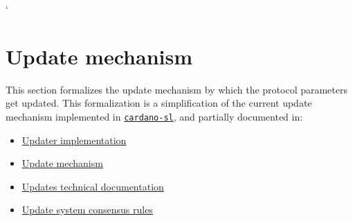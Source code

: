 \newcommand{\UProp}{\ensuremath{\type{UProp}}}
\newcommand{\UPropId}{\ensuremath{\type{UpId}}}
\newcommand{\UPropSD}{\ensuremath{\type{UpSD}}}
\newcommand{\ProtVer}{\ensuremath{\type{ProtVer}}}
\newcommand{\ProtPm}{\ensuremath{\type{Ppm}}}
\newcommand{\Rpus}{\ensuremath{\type{Rpus}}}
\newcommand{\UPVEnv}{\ensuremath{\type{UPVEnv}}}
\newcommand{\UPVState}{\ensuremath{\type{UPVState}}}
\newcommand{\UPLEnv}{\ensuremath{\type{UPLEnv}}}
\newcommand{\UPLState}{\ensuremath{\type{UPLState}}}
\newcommand{\UPREnv}{\ensuremath{\type{UPREnv}}}
\newcommand{\UPRState}{\ensuremath{\type{UPRState}}}
\newcommand{\Vote}{\ensuremath{\type{Vote}}}
\newcommand{\VEnv}{\ensuremath{\type{VEnv}}}
\newcommand{\VState}{\ensuremath{\type{VState}}}
\newcommand{\BVREnv}{\ensuremath{\type{BVREnv}}}
\newcommand{\BVRState}{\ensuremath{\type{BVRState}}}
\newcommand{\ApName}{\ensuremath{\type{ApName}}}
\newcommand{\SWVer}{\ensuremath{\type{SWVer}}}
\newcommand{\ApVer}{\ensuremath{\type{ApVer}}}

\newcommand{\upSize}[1]{\ensuremath{\fun{upSize}~\var{#1}}}
\newcommand{\upPV}[1]{\ensuremath{\fun{upPV}~\var{#1}}}
\newcommand{\upId}[1]{\ensuremath{\fun{upId}~\var{#1}}}
\newcommand{\upSig}[1]{\ensuremath{\fun{upSig}~\var{#1}}}
\newcommand{\upSigData}[1]{\ensuremath{\fun{upSigData}~\var{#1}}}
\newcommand{\upIssuer}[1]{\ensuremath{\fun{upIssuer}~\var{#1}}}
\newcommand{\upParams}[1]{\ensuremath{\fun{upParams}~\var{#1}}}
\newcommand{\upSwVer}[1]{\ensuremath{\fun{upSwVer}~\var{#1}}}
\newcommand{\vCaster}[1]{\ensuremath{\fun{vCaster}~\var{#1}}}
\newcommand{\vPropId}[1]{\ensuremath{\fun{vPropId}~\var{#1}}}
\newcommand{\vSig}[1]{\ensuremath{\fun{vSig}~\var{#1}}}


\lstMakeShortInline[columns=fixed]`

\section{Update mechanism}
\label{sec:update}

This section formalizes the update mechanism by which the protocol parameters
get updated. This formalization is a simplification of the current update
mechanism implemented in
\href{https://github.com/input-output-hk/cardano-sl/}{\texttt{cardano-sl}}, and
partially documented in:
\begin{itemize}
\item \href{https://cardanodocs.com/technical/updater/}{Updater implementation}
\item \href{https://cardanodocs.com/cardano/update-mechanism/}{Update mechanism}
\item \href{https://github.com/input-output-hk/cardano-sl/blob/develop/wallet-new/docs/updates.md}{Updates technical documentation}
\item
  \href{https://github.com/input-output-hk/cardano-sl/blob/develop/docs/block-processing/us.md}{Update
    system consensus rules}
\end{itemize}


